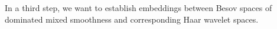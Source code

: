 \documentclass[12pt]{article}
\DeclareMathOperator{\wav}{wav}
\DeclareMathOperator{\wor}{wor}
\newtheorem{corollary}{Corollary}
\newcommand{\HH}{\mathcal{H}}
\newcommand{\mig}[1]{\textcolor{blue}{#1}}
\begin{document}








In a third step, we want to establish embeddings between Besov spaces of dominated mixed
smoothness and corresponding Haar wavelet spaces.

\end{document}
